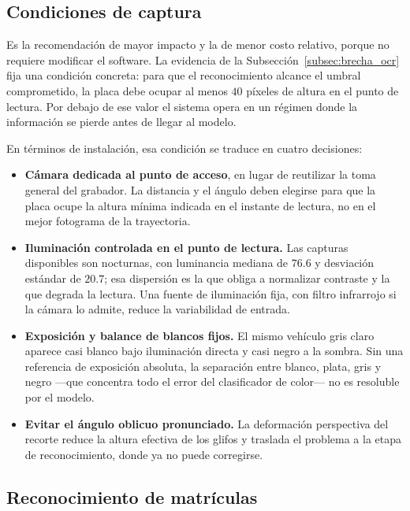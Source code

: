 \subsection{Condiciones de captura}

Es la recomendación de mayor impacto y la de menor costo relativo, porque no
requiere modificar el software. La evidencia de la
Subsección~\ref{subsec:brecha_ocr} fija una condición concreta: para que el
reconocimiento alcance el umbral comprometido, la placa debe ocupar al menos $40$
píxeles de altura en el punto de lectura. Por debajo de ese valor el sistema
opera en un régimen donde la información se pierde antes de llegar al modelo.

En términos de instalación, esa condición se traduce en cuatro decisiones:

\begin{itemize}
    \item \textbf{Cámara dedicada al punto de acceso}, en lugar de reutilizar la
        toma general del grabador. La distancia y el ángulo deben elegirse para
        que la placa ocupe la altura mínima indicada en el instante de lectura,
        no en el mejor fotograma de la trayectoria.
    \item \textbf{Iluminación controlada en el punto de lectura.} Las capturas
        disponibles son nocturnas, con luminancia mediana de $76{.}6$ y
        desviación estándar de $20{.}7$; esa dispersión es la que obliga a
        normalizar contraste y la que degrada la lectura. Una fuente de
        iluminación fija, con filtro infrarrojo si la cámara lo admite, reduce la
        variabilidad de entrada.
    \item \textbf{Exposición y balance de blancos fijos.} El mismo vehículo gris
        claro aparece casi blanco bajo iluminación directa y casi negro a la
        sombra. Sin una referencia de exposición absoluta, la separación entre
        blanco, plata, gris y negro ---que concentra todo el error del
        clasificador de color--- no es resoluble por el modelo.
    \item \textbf{Evitar el ángulo oblicuo pronunciado.} La deformación
        perspectiva del recorte reduce la altura efectiva de los glifos y
        traslada el problema a la etapa de reconocimiento, donde ya no puede
        corregirse.
\end{itemize}

\subsection{Reconocimiento de matrículas}

